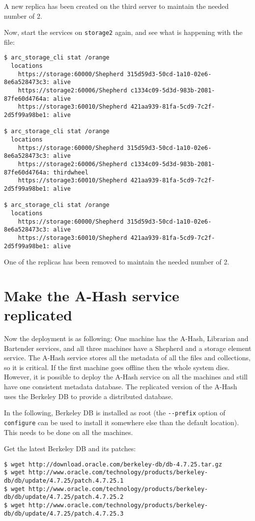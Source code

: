 \documentclass{article}
\begin{document}
A new replica has been created on the third server to maintain the needed number of 2.

Now, start the services on \verb!storage2! again, and see what is happening with the file:

\begin{verbatim}
$ arc_storage_cli stat /orange
  locations
    https://storage:60000/Shepherd 315d59d3-50cd-1a10-02e6-8e6a528473c3: alive
    https://storage2:60006/Shepherd c1334c09-5d3d-983b-2081-87fe60d4764a: alive
    https://storage3:60010/Shepherd 421aa939-81fa-5cd9-7c2f-2d5f99a98be1: alive

$ arc_storage_cli stat /orange
  locations
    https://storage:60000/Shepherd 315d59d3-50cd-1a10-02e6-8e6a528473c3: alive
    https://storage2:60006/Shepherd c1334c09-5d3d-983b-2081-87fe60d4764a: thirdwheel
    https://storage3:60010/Shepherd 421aa939-81fa-5cd9-7c2f-2d5f99a98be1: alive

$ arc_storage_cli stat /orange
  locations
    https://storage:60000/Shepherd 315d59d3-50cd-1a10-02e6-8e6a528473c3: alive
    https://storage3:60010/Shepherd 421aa939-81fa-5cd9-7c2f-2d5f99a98be1: alive
\end{verbatim}

One of the replicas has been removed to maintain the needed number of 2.

\section{Make the A-Hash service replicated} %
\label{sec:make_the_a_hash_service_replicated}

Now the deployment is as following: One machine has the A-Hash, Librarian and Bartender services, and all three machines have a Shepherd and a storage element service. The A-Hash service stores all the metadata of all the files and collections, so it is critical. If the first machine goes offline then the whole system dies. However, it is possible to deploy the A-Hash service on all the machines and still have one consistent metadata database. The replicated version of the A-Hash uses the Berkeley DB to provide a distributed database.

In the following, Berkeley DB is installed as root (the \verb!--prefix! option of \verb!configure! can be used to install it somewhere else than the default location). This needs to be done on all the machines.

Get the latest Berkeley DB and its patches:
\begin{verbatim}
$ wget http://download.oracle.com/berkeley-db/db-4.7.25.tar.gz
$ wget http://www.oracle.com/technology/products/berkeley-db/db/update/4.7.25/patch.4.7.25.1
$ wget http://www.oracle.com/technology/products/berkeley-db/db/update/4.7.25/patch.4.7.25.2
$ wget http://www.oracle.com/technology/products/berkeley-db/db/update/4.7.25/patch.4.7.25.3
\end{verbatim}
\end{document}
